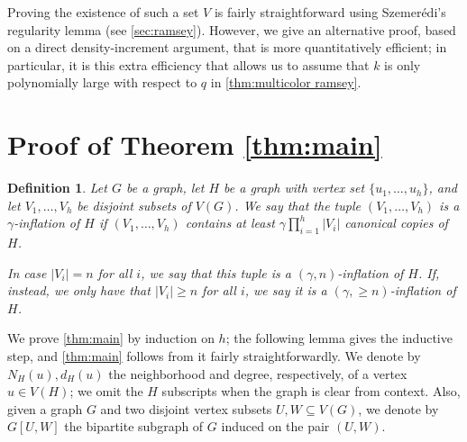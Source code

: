 \documentclass{aic}
\theoremstyle{plain}
\newtheorem{definition}[theorem]{Definition}
\theoremstyle{remark}
\newcommand\ab[1]{\lvert #1 \rvert}
\begin{document}
Proving the existence of such a set $V$ is fairly straightforward using Szemer\'edi's regularity lemma (see \cref{sec:ramsey}). However, we give an alternative proof, based on a direct density-increment argument, that is more quantitatively efficient; in particular, it is this extra efficiency that allows us to assume that $k$ is only polynomially large with respect to $q$ in \cref{thm:multicolor ramsey}.



\section{Proof of Theorem \ref{thm:main}}\label{sec:nikiforov}
\begin{definition}
    Let $G$ be a graph, let $H$ be a graph with vertex set $\{u_1,\dots,u_h\}$, and let $V_1,\dots,V_h$ be disjoint subsets of $V(G)$. We say that the tuple $(V_1,\dots,V_h)$ is a \emph{$\gamma$-inflation of $H$} if $(V_1,\dots,V_h)$ contains at least $\gamma \prod_{i=1}^h \ab{V_i}$ canonical copies of $H$.

    In case $\ab{V_i}=n$ for all $i$, we say that this tuple is a $(\gamma,n)$-inflation of $H$. If, instead, we only have that $\ab{V_i} \geq n$ for all $i$, we say it is a $(\gamma,{\geq n})$-inflation of $H$.
\end{definition}


We prove \cref{thm:main} by induction on $h$; the following lemma gives the inductive step, and \cref{thm:main} follows from it fairly straightforwardly. We denote by $N_H(u),d_H(u)$ the neighborhood and degree, respectively, of a vertex $u \in V(H)$; we omit the $H$ subscripts when the graph is clear from context. Also, given a graph $G$ and two disjoint vertex subsets $U,W \subseteq V(G)$, we denote by $G[U,W]$ the bipartite subgraph of $G$ induced on the pair $(U,W)$. 
\end{document}
